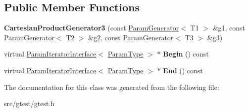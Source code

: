 \subsection*{Public Member Functions}
\begin{DoxyCompactItemize}
\item 
\mbox{\label{classtesting_1_1internal_1_1_cartesian_product_generator3_afdca1e94b01f654564b9cbe66fb5ca94}} 
{\bfseries Cartesian\+Product\+Generator3} (const \mbox{\hyperlink{classtesting_1_1internal_1_1_param_generator}{Param\+Generator}}$<$ T1 $>$ \&g1, const \mbox{\hyperlink{classtesting_1_1internal_1_1_param_generator}{Param\+Generator}}$<$ T2 $>$ \&g2, const \mbox{\hyperlink{classtesting_1_1internal_1_1_param_generator}{Param\+Generator}}$<$ T3 $>$ \&g3)
\item 
\mbox{\label{classtesting_1_1internal_1_1_cartesian_product_generator3_ac06420eea4a669c4a93503e0d1eccdc8}} 
virtual \mbox{\hyperlink{classtesting_1_1internal_1_1_param_iterator_interface}{Param\+Iterator\+Interface}}$<$ \mbox{\hyperlink{classstd_1_1tr1_1_1tuple}{Param\+Type}} $>$ $\ast$ {\bfseries Begin} () const
\item 
\mbox{\label{classtesting_1_1internal_1_1_cartesian_product_generator3_a892abda9027eca8daf3d141dde4903cc}} 
virtual \mbox{\hyperlink{classtesting_1_1internal_1_1_param_iterator_interface}{Param\+Iterator\+Interface}}$<$ \mbox{\hyperlink{classstd_1_1tr1_1_1tuple}{Param\+Type}} $>$ $\ast$ {\bfseries End} () const
\end{DoxyCompactItemize}


The documentation for this class was generated from the following file\+:\begin{DoxyCompactItemize}
\item 
src/gtest/gtest.\+h\end{DoxyCompactItemize}
